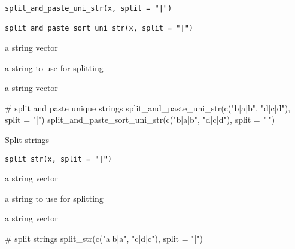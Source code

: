 \documentclass[letterpaper]{book}
\begin{document}
%
\begin{Usage}
\begin{verbatim}
split_and_paste_uni_str(x, split = "|")

split_and_paste_sort_uni_str(x, split = "|")
\end{verbatim}
\end{Usage}
%
\begin{Arguments}
\begin{ldescription}
\item[\code{x}] a string vector

\item[\code{split}] a string to use for splitting
\end{ldescription}
\end{Arguments}
%
\begin{Value}
a string vector
\end{Value}
%
\begin{Examples}
\begin{ExampleCode}
# split and paste unique strings
split_and_paste_uni_str(c("b|a|b", "d|c|d"), split = "|")
split_and_paste_sort_uni_str(c("b|a|b", "d|c|d"), split = "|")

\end{ExampleCode}
\end{Examples}
%
\begin{Description}
Split strings
\end{Description}
%
\begin{Usage}
\begin{verbatim}
split_str(x, split = "|")
\end{verbatim}
\end{Usage}
%
\begin{Arguments}
\begin{ldescription}
\item[\code{x}] a string vector

\item[\code{split}] a string to use for splitting
\end{ldescription}
\end{Arguments}
%
\begin{Value}
a string vector
\end{Value}
%
\begin{Examples}
\begin{ExampleCode}
# split strings
split_str(c("a|b|a", "c|d|c"), split = "|")

\end{ExampleCode}
\end{Examples}
\end{document}
